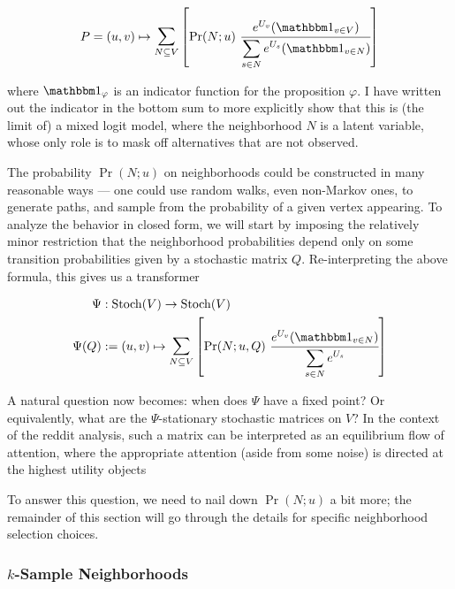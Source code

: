 \documentclass{article}
\theoremstyle{definition}
\begin{document}
	\begin{equation}
		P = (u,v) \mapsto \mathlarger{\sum}_{{N \subseteq V}} \left[ \Pr(N; u)~\cfrac{ e^{U_v}  (\mathbbm 1_{v \in V}) }{ \displaystyle \sum\limits_{ s \in N } e^{U_s}  (\mathbbm 1_{v \in N})} \right]
	\end{equation}
	
	where $\mathbbm 1_{\varphi}$ is an indicator function for the proposition $\varphi$. I have written out the indicator in the bottom sum to more explicitly show that this is (the limit of) a mixed logit model, where the neighborhood $N$ is a latent variable, whose only role is to mask off alternatives that are not observed.
	
	The probability $\Pr(N; u)$ on neighborhoods could be constructed in many reasonable ways --- one could use random walks, even non-Markov ones, to generate paths, and sample from the probability of a given vertex appearing. To analyze the behavior in closed form, we will start by imposing the relatively minor restriction that the neighborhood probabilities depend only on some transition probabilities given by a stochastic matrix $Q$. Re-interpreting the above formula, this gives us a transformer 

	\begin{equation}
		\begin{aligned}
			\Psi&:\mathrm{Stoch}(V) \to \mathrm{Stoch}(V) \\
			\Psi(Q) &:=(u,v) \mapsto \mathlarger{\sum}_{{N \subseteq V}} \left[ \Pr(N; u, Q)~\cfrac{ e^{U_v} (\mathbbm 1_{v \in N})  }{ \displaystyle \sum\limits_{ s \in N } e^{U_s} } \right]
		\end{aligned}
	\end{equation}
	
	A natural question now becomes: when does $\Psi$ have a fixed point? Or equivalently, what are the $\Psi$-stationary stochastic matrices on $V$? In the context of the reddit analysis, such a matrix can be interpreted as an equilibrium flow of attention, where the appropriate attention (aside from some noise) is directed at the highest utility objects
	
	To answer this question, we need to nail down $\Pr(N;u)$ a bit more; the remainder of this section will go through the details for specific neighborhood selection choices.
	
	\subsubsection{$k$-Sample Neighborhoods}
	
\end{document}
